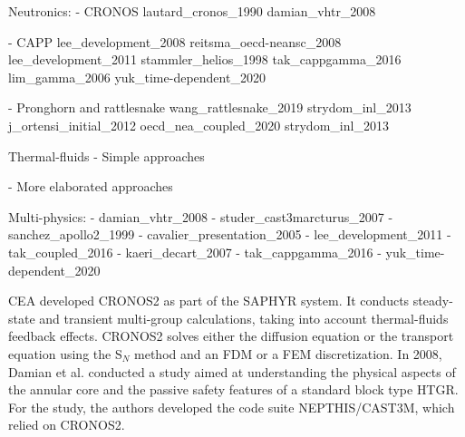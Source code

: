Neutronics:
- CRONOS
lautard_cronos_1990
damian_vhtr_2008

- CAPP
lee_development_2008
reitsma_oecd-neansc_2008
lee_development_2011
stammler_helios_1998
tak_cappgamma_2016
lim_gamma_2006
yuk_time-dependent_2020

- Pronghorn and rattlesnake
wang_rattlesnake_2019
strydom_inl_2013
j_ortensi_initial_2012
oecd_nea_coupled_2020
strydom_inl_2013

Thermal-fluids
- Simple approaches

- More elaborated approaches


Multi-physics:
- damian_vhtr_2008
- studer_cast3marcturus_2007
- sanchez_apollo2_1999
- cavalier_presentation_2005
- lee_development_2011
- tak_coupled_2016
- kaeri_decart_2007
- tak_cappgamma_2016
- yuk_time-dependent_2020

\gls{CEA} developed CRONOS2 \cite{lautard_cronos_1990} as part of the SAPHYR system.
It conducts steady-state and transient multi-group calculations, taking into account thermal-fluids feedback effects.
CRONOS2 solves either the diffusion equation or the transport equation using the S$_N$ method and an \gls{FDM} or a \gls{FEM} discretization.
In 2008, Damian et al. \cite{damian_vhtr_2008} conducted a study aimed at understanding the physical aspects of the annular core and the passive safety features of a standard block type \gls{HTGR}.
For the study, the authors developed the code suite NEPTHIS/CAST3M, which relied on CRONOS2.

